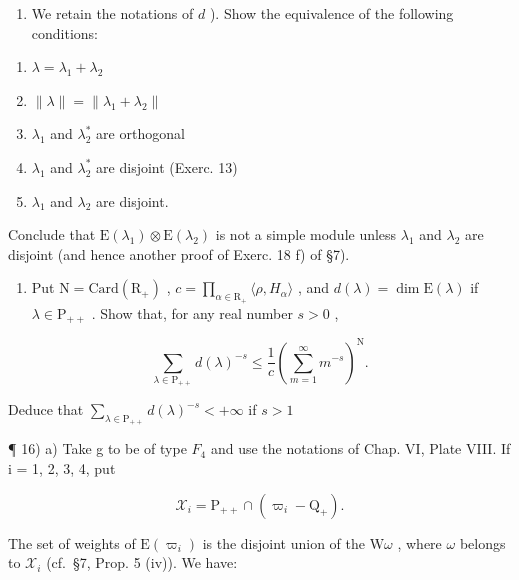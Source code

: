 \begin{enumerate}
\def\labelenumi{\alph{enumi})}
\setcounter{enumi}{4}
\tightlist
\item
  We retain the notations of \(d\) ). Show the equivalence of the following conditions:
\end{enumerate}

\begin{enumerate}
\def\labelenumi{(\roman{enumi})}
\item
  \(\lambda = \lambda_{1} + \lambda_{2}\)
\item
  \(\| \lambda \| = \| \lambda_1 + \lambda_2 \|\)
\item
  \(\lambda_{1}\) and \(\lambda_2^*\) are orthogonal
\item
  \(\lambda_{1}\) and \(\lambda_2^*\) are disjoint (Exerc. 13)
\item
  \(\lambda_{1}\) and \(\lambda_{2}\) are disjoint.
\end{enumerate}

Conclude that \(\mathrm{E}(\lambda_{1})\otimes\mathrm{E}(\lambda_{2})\) is not a simple module unless \(\lambda_{1}\) and \(\lambda_{2}\) are disjoint (and hence another proof of Exerc. 18 f) of §7).

\begin{enumerate}
\def\labelenumi{\arabic{enumi})}
\setcounter{enumi}{14}
\tightlist
\item
  Put \(\mathrm{N} = \mathrm{Card}(\mathrm{R}_{+})\) , \(c = \prod_{\alpha \in \mathrm{R}_{+}} \langle \rho, H_{\alpha} \rangle\) , and \(d(\lambda) = \dim \mathrm{E}(\lambda)\) if \(\lambda \in \mathrm{P}_{++}\) . Show that, for any real number \(s > 0\) ,
\end{enumerate}

\[
\sum_ {\lambda \in \mathrm{P} _ {+ +}} d (\lambda) ^ {- s} \leq \frac {1}{c} \left(\sum_ {m = 1} ^ {\infty} m ^ {- s}\right) ^ {\mathrm{N}}.
\]

Deduce that \(\sum_{\lambda \in \mathrm{P}_{+ + }}d(\lambda)^{-s} <   + \infty\) if \(s > 1\)

¶ 16) a) Take g to be of type \(F_{4}\) and use the notations of Chap. VI, Plate VIII. If i = 1, 2, 3, 4, put

\[
\mathcal {X} _ {i} = \mathrm{P} _ {+ +} \cap (\varpi_ {i} - \mathrm{Q} _ {+}).
\]

The set of weights of \(\mathrm{E}(\varpi_i)\) is the disjoint union of the \(\mathrm{W}\omega\) , where \(\omega\) belongs to \(\mathcal{X}_i\) (cf.~§7, Prop. 5 (iv)). We have:

